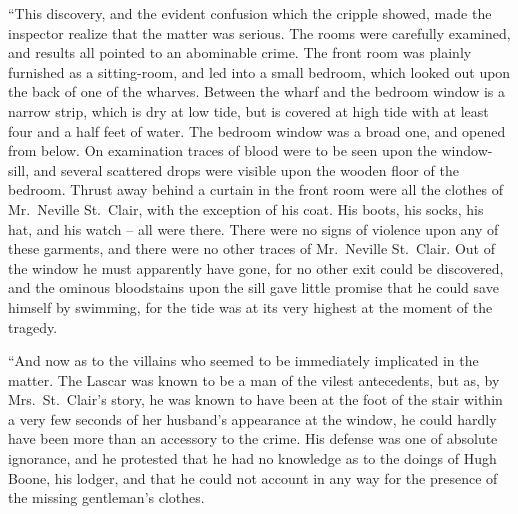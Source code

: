 “This discovery, and the evident confusion which the cripple
showed, made the inspector realize that the matter was
serious. The rooms were carefully examined, and results all
pointed to an abominable crime. The front room was plainly
furnished as a sitting-room, and led into a small bedroom,
which looked out upon the back of one of the wharves. Between
the wharf and the bedroom window is a narrow strip,
which is dry at low tide, but is covered at high tide with at
least four and a half feet of water. The bedroom window was
a broad one, and opened from below. On examination traces
of blood were to be seen upon the window-sill, and several
scattered drops were visible upon the wooden floor of the bedroom.
Thrust away behind a curtain in the front room were
all the clothes of Mr.~Neville St.~Clair, with the exception of
his coat. His boots, his socks, his hat, and his watch -- all
were there. There were no signs of violence upon any of
these garments, and there were no other traces of Mr.~Neville
St.~Clair. Out of the window he must apparently have gone,
for no other exit could be discovered, and the ominous bloodstains
upon the sill gave little promise that he could save himself
by swimming, for the tide was at its very highest at the
moment of the tragedy.

“And now as to the villains who seemed to be immediately
implicated in the matter. The Lascar was known to be a
man of the vilest antecedents, but as, by Mrs.~St.~Clair’s story,
he was known to have been at the foot of the stair within
a very few seconds of her husband’s appearance at the window,
he could hardly have been more than an accessory to
the crime. His defense was one of absolute ignorance, and
he protested that he had no knowledge as to the doings of
Hugh Boone, his lodger, and that he could not account in any
way for the presence of the missing gentleman’s clothes.

